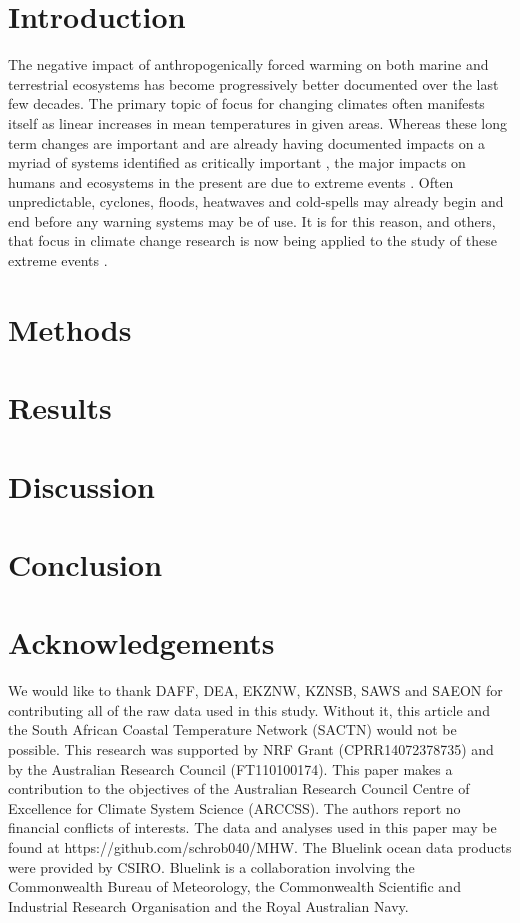 \documentclass[a4paper,10pt,review]{elsarticle}
\begin{document}
\linenumbers

\section{Introduction}
The negative impact of anthropogenically forced warming on both marine and terrestrial ecosystems has become progressively better documented over the last few decades. The primary topic of focus for changing climates often manifests itself as linear increases in mean temperatures in given areas. Whereas these long term changes are important and are already having documented impacts on a myriad of systems identified as critically important \citep{IPCC2014}, the major impacts on humans and ecosystems in the present are due to extreme events \citep{Easterling2000}. Often unpredictable, cyclones, floods, heatwaves and cold-spells may already begin and end before any warning systems may be of use. It is for this reason, and others, that focus in climate change research is now being applied to the study of these extreme events \citep{Jentsch2007}.

\section{Methods}

\section{Results}

\section{Discussion}

\section{Conclusion}

\section*{Acknowledgements}
We would like to thank DAFF, DEA, EKZNW, KZNSB, SAWS and SAEON for contributing all of the raw data used in this study. Without it, this article and the South African Coastal Temperature Network (SACTN) would not be possible. This research was supported by NRF Grant (CPRR14072378735) and by the Australian Research Council (FT110100174). This paper makes a contribution to the objectives of the Australian Research Council Centre of Excellence for Climate System Science (ARCCSS). The authors report no financial conflicts of interests. The data and analyses used in this paper may be found at https://github.com/schrob040/MHW. The Bluelink ocean data products were provided by CSIRO. Bluelink is a collaboration involving the Commonwealth Bureau of Meteorology, the Commonwealth Scientific and Industrial Research Organisation and the Royal Australian Navy.
\end{document}
